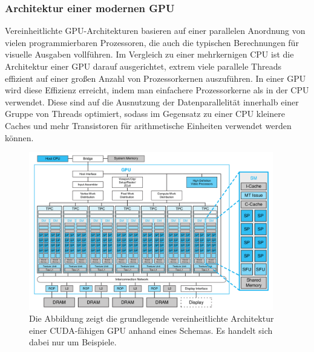 \documentclass[crop=false]{standalone}
\begin{document}
      \subsubsection{Architektur einer modernen GPU} %
      \label{ssub:architektur_einer_modernen_gpu}
        Vereinheitlichte GPU-Architekturen basieren auf einer parallelen Anordnung von vielen programmierbaren Prozessoren, die auch die typischen Berechnungen für visuelle Ausgaben vollführen.
        Im Vergleich zu einer mehrkernigen CPU ist die Architektur einer GPU darauf ausgerichtet, extrem viele parallele Threads effizient auf einer großen Anzahl von Prozessorkernen auszuführen.
        In einer GPU wird diese Effizienz erreicht, indem man einfachere Prozessorkerne als in der CPU verwendet.
        Diese sind auf die Ausnutzung der Datenparallelität innerhalb einer Gruppe von Threads optimiert, sodass im Gegensatz zu einer CPU kleinere Caches und mehr Transistoren für arithmetische Einheiten verwendet werden können.
        \cite[S.~A11]{Patterson2011}

        \begin{figure}[h]
          \center
          \includegraphics[width=0.95\textwidth]{images/unified_gpu_architecture.png}
          \caption[Grundlegende Architektur einer CUDA-fähigen GPU]{%
            Die Abbildung zeigt die grundlegende vereinheitlichte Architektur einer CUDA-fähigen GPU anhand eines Schemas.
            Es handelt sich dabei nur um Beispiele.
            \cite[S.~9]{Kirk2010}
          }
          \label{fig:gpu-architecture}
        \end{figure}
\end{document}
